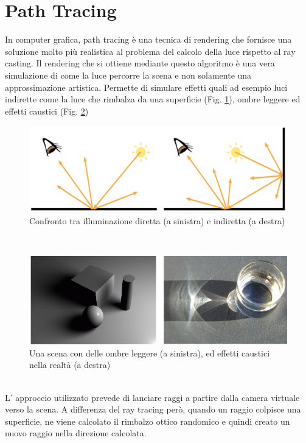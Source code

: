 \newpage
\section{Path Tracing}
\label{sec:chapter_stato_arte_path_tracing}
In computer grafica, path tracing è una tecnica di rendering che fornisce una soluzione molto più realistica al problema del calcolo della luce rispetto al ray casting.
Il rendering che si ottiene mediante questo algoritmo è una vera simulazione di come la luce percorre la scena e non solamente una approssimazione artistica. Permette di simulare effetti quali ad esempio luci indirette come la luce che rimbalza da una superficie (Fig. \ref{fig:stato_arte_luci_dir_ind}), ombre leggere ed effetti caustici (Fig. \ref{fig:stato_arte_ombre_caust}) 
\\
\begin{figure}[htb]
 \centering
 \includegraphics[width=0.75\linewidth]{images/chapter_stato_arte/stato_arte_luci_dir_ind.png}\hfill
 \caption[Illuminazione diretta e indiretta]{Confronto tra illuminazione diretta (a sinistra) e indiretta (a destra)}
 \label{fig:stato_arte_luci_dir_ind}
\end{figure}
\\
\begin{figure}[htb]
 \centering
 \includegraphics[width=0.75\linewidth]{images/chapter_stato_arte/stato_arte_ombre_caust.png}\hfill
 \caption[Ombreggiature ed effetti caustici]{Una scena con delle ombre leggere (a sinistra), ed effetti caustici nella realtà (a destra)}
 \label{fig:stato_arte_ombre_caust}
\end{figure}
\\
L’ approccio utilizzato prevede di lanciare raggi a partire dalla camera virtuale verso la scena. 
A differenza del ray tracing però, quando un raggio colpisce una superficie, ne viene calcolato il rimbalzo ottico randomico e quindi creato un  nuovo raggio nella direzione calcolata. 
